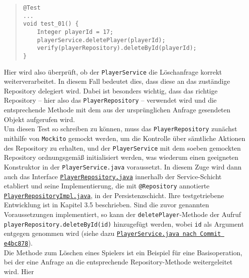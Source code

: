 \begin{quote}
\begin{verbatim}
@Test
...
void test_01() {
    Integer playerId = 17;
    playerService.deletePlayer(playerId);
    verify(playerRepository).deleteById(playerId);
}
\end{verbatim}
\end{quote}

Hier wird also überprüft, ob der \texttt{PlayerService} die Löschanfrage korrekt 
weiterverarbeitet. In diesem Fall bedeutet dies, dass diese an das zuständige 
Repository delegiert wird. Dabei ist besonders wichtig, dass das richtige Repository 
-- hier also das \texttt{PlayerRepository} -- verwendet wird und die entsprechende 
Methode mit dem aus der ursprünglichen Anfrage gesendeten Objekt aufgerufen wird. \\ 
Um diesen Test so schreiben zu können, muss das \texttt{PlayerRepository} zunächst 
mithilfe von \texttt{Mockito} gemockt werden, um die Kontrolle über sämtliche 
Aktionen des Repository zu erhalten, und der \texttt{PlayerService} mit dem soeben 
gemockten Repository ordnungsgemäß initialisiert werden, was wiederum einen 
geeigneten Konstruktor in der \texttt{PlayerService.java} voraussetzt. In diesem Zuge 
wird dann auch das Interface 
\href{https://github.com/FlorianOhmes/bat_spielzeitenplaner/blob/e4bc878ddf49753d522e2363f3b258093bab1d2f/spielzeitenplaner/src/main/java/de/bathesis/spielzeitenplaner/services/PlayerRepository.java}{\texttt{PlayerRepository.java}}
innerhalb der Service-Schicht etabliert und seine Implementierung, die mit 
\texttt{@Repository} annotierte 
\href{https://github.com/FlorianOhmes/bat_spielzeitenplaner/blob/e4bc878ddf49753d522e2363f3b258093bab1d2f/spielzeitenplaner/src/main/java/de/bathesis/spielzeitenplaner/database/PlayerRepositoryImpl.java}{\texttt{PlayerRepositoryImpl.java}}, 
in der Persistenzschicht. Ihre testgetriebene Entwicklung ist in Kapitel 3.5 
beschrieben. Sind die zuvor genannten Voraussetzungen implementiert, so kann der 
\texttt{deletePlayer}-Methode der Aufruf \texttt{playerRepository.deleteById(id)} 
hinzugefügt werden, wobei \texttt{id} als Argument entgegen genommen wird (siehe dazu 
\href{https://github.com/FlorianOhmes/bat_spielzeitenplaner/blob/e4bc878ddf49753d522e2363f3b258093bab1d2f/spielzeitenplaner/src/main/java/de/bathesis/spielzeitenplaner/services/PlayerService.java}{\texttt{PlayerService.java nach Commit e4bc878}}). \\ 
Die Methode zum Löschen eines Spielers ist ein Beispiel für eine Basisoperation, bei 
der eine Anfrage an die entsprechende Repository-Methode weitergeleitet wird. Hier 

